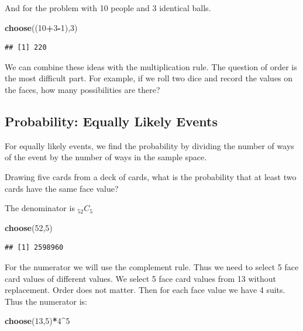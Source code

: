 \documentclass[]{book}
\newenvironment{Shaded}{\begin{snugshade}}{\end{snugshade}}
\newcommand{\KeywordTok}[1]{\textcolor[rgb]{0.13,0.29,0.53}{\textbf{#1}}}
\newcommand{\DecValTok}[1]{\textcolor[rgb]{0.00,0.00,0.81}{#1}}
\newcommand{\OperatorTok}[1]{\textcolor[rgb]{0.81,0.36,0.00}{\textbf{#1}}}
\newcommand{\NormalTok}[1]{#1}
\theoremstyle{definition}
\theoremstyle{definition}
\theoremstyle{definition}
\theoremstyle{remark}
\begin{document}
And for the problem with 10 people and 3 identical balls.

\begin{Shaded}
\begin{Highlighting}[]
\KeywordTok{choose}\NormalTok{((}\DecValTok{10}\OperatorTok{+}\DecValTok{3}\OperatorTok{-}\DecValTok{1}\NormalTok{),}\DecValTok{3}\NormalTok{)}
\end{Highlighting}
\end{Shaded}

\begin{verbatim}
## [1] 220
\end{verbatim}

We can combine these ideas with the multiplication rule. The question of
order is the most difficult part. For example, if we roll two dice and
record the values on the faces, how many possibilities are there?

\subsection{Probability: Equally Likely
Events}\label{probability-equally-likely-events}

For equally likely events, we find the probability by dividing the
number of ways of the event by the number of ways in the sample space.

Drawing five cards from a deck of cards, what is the probability that at
least two cards have the same face value?

The denominator is \(_{52}C_{5}\)

\begin{Shaded}
\begin{Highlighting}[]
\KeywordTok{choose}\NormalTok{(}\DecValTok{52}\NormalTok{,}\DecValTok{5}\NormalTok{)}
\end{Highlighting}
\end{Shaded}

\begin{verbatim}
## [1] 2598960
\end{verbatim}

For the numerator we will use the complement rule. Thus we need to
select 5 face card values of different values. We select 5 face card
values from 13 without replacement. Order does not matter. Then for each
face value we have 4 suits. Thus the numerator is:

\begin{Shaded}
\begin{Highlighting}[]
\KeywordTok{choose}\NormalTok{(}\DecValTok{13}\NormalTok{,}\DecValTok{5}\NormalTok{)}\OperatorTok{*}\DecValTok{4}\OperatorTok{^}\DecValTok{5}
\end{Highlighting}
\end{Shaded}
\end{document}
